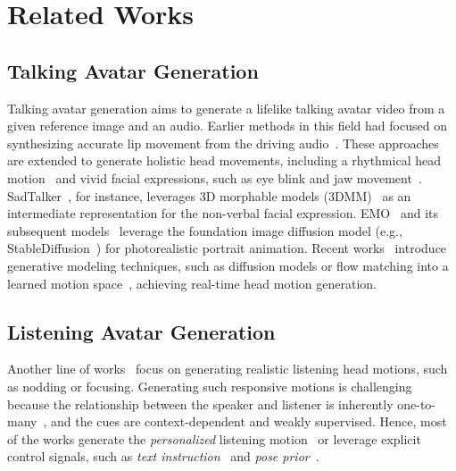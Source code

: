 \section{Related Works} \label{sec:related}
\subsection{Talking Avatar Generation}
Talking avatar generation aims to generate a lifelike talking avatar video from a given reference image and an audio. Earlier methods in this field had focused on synthesizing accurate lip movement from the driving audio~\citep{wav2lip, makeittalk, stylelipsync, stylesync, keysync}. These approaches are extended to generate holistic head movements, including a rhythmical head motion~\citep{makeittalk, emo, float, vasa_1} and vivid facial expressions, such as eye blink and jaw movement~\citep{sadtalker, megaportrait, emoportraits, vasa_1, liveportrait}. SadTalker~\citep{sadtalker}, for instance, leverages 3D morphable models (3DMM)~\citep{bfm} as an intermediate representation for the non-verbal facial expression. EMO~\citep{emo} and its subsequent models~\citep{loopy, hallo3, echomimic} leverage the foundation image diffusion model (e.g., StableDiffusion~\citep{ldm}) for photorealistic portrait animation. 
Recent works~\citep{vasa_1, anitalker, float} introduce generative modeling techniques, such as diffusion models or flow matching into a learned motion space~\citep{megaportrait, lia}, achieving real-time head motion generation.

\subsection{Listening Avatar Generation}
Another line of works~\citep{l2l, rlhg, mfr_net, pch, customlistener, ditailistener} focus on generating realistic listening head motions, such as nodding or focusing. Generating such responsive motions is challenging because the relationship between the speaker and listener is inherently one-to-many~\citep{l2l, diffusion_listening}, and the cues are context-dependent and weakly supervised.
Hence, most of the works generate the \textit{personalized} listening motion~\citep{l2l, rlhg} or leverage explicit control signals, such as \textit{text instruction}~\citep{customlistener} and \textit{pose prior}~\citep{diffusion_listening}. 

